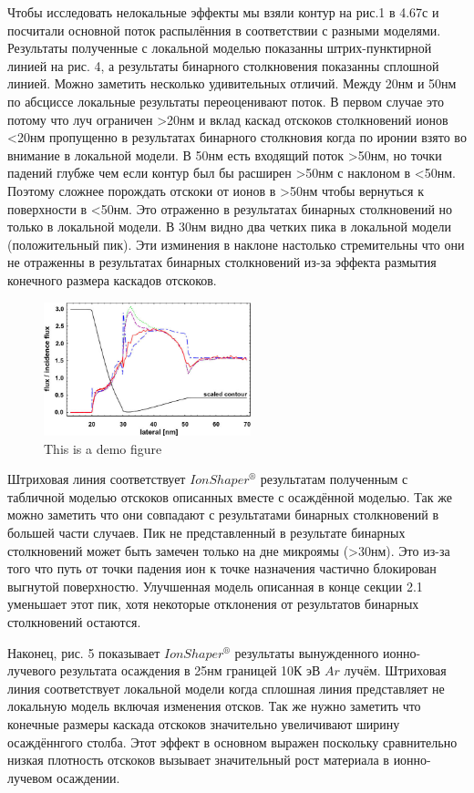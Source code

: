 \documentclass[a4paper,fontsize=12pt]{article}
\begin{document}
Чтобы исследовать нелокальные эффекты мы взяли контур на рис.1 в 4.67с и посчитали основной поток распылённия в соответствии с разными моделями. Результаты полученные с локальной моделью показанны штрих-пунктирной линией на рис. 4, а результаты бинарного столкновения показанны сплошной линией. Можно заметить несколько удивительных отличий. Между 20нм и 50нм по абсциссе локальные результаты переоценивают поток. В первом случае это потому что луч ограничен \textgreater 20нм и вклад каскад отскоков столкновений ионов \textless 20нм пропущенно в результатах бинарного столкновия когда по иронии взято во внимание в локальной модели. В 50нм есть входящий поток \textgreater 50нм, но точки падений глубже чем если контур был бы расширен \textgreater 50нм с наклоном в \textless 50нм. Поэтому сложнее порождать отскоки от ионов в \textgreater 50нм чтобы вернуться к поверхности в \textless 50нм. Это отраженно в результатах бинарных столкновений но только в локальной модели. В 30нм видно два четких пика в локальной модели (положительный пик). Эти изминения в наклоне настолько стремительны что они не отраженны в результатах бинарных столкновений из-за эффекта размытия конечного размера каскадов отскоков.


\begin{figure}[h]
    \centering
    \includegraphics[width=6cm]{images/4.eps}
    \caption{This is a demo figure}
    \label{fig:demo1}
\end{figure}


Штриховая линия соответствует $IonShaper^{®}$ результатам полученным с табличной моделью отскоков описанных вместе с осаждённой моделью. Так же можно заметить что они совпадают с результатами бинарных столкновений в большей части случаев. Пик не представленный в результате бинарных столкновений может быть замечен только на дне микроямы (\textgreater 30нм). Это из-за того что путь от точки падения ион к точке назначения частично блокирован выгнутой поверхностю. Улучшенная модель описанная в конце секции 2.1 уменьшает этот пик, хотя некоторые отклонения от результатов бинарных столкновений остаются.

Наконец, рис. 5 показывает $IonShaper^{®}$ результаты вынужденного ионно-лучевого результата осаждения в 25нм границей 10К эВ $Ar$ лучём. Штриховая линия соответствует локальной модели когда сплошная линия представляет не локальную модель включая изменения отсков. Так же нужно заметить что конечные размеры каскада отскоков значительно увеличивают ширину осаждённгого столба. Этот эффект в основном выражен поскольку сравнительно низкая плотность отскоков вызывает значительный рост материала в ионно-лучевом осаждении.
\end{document}
